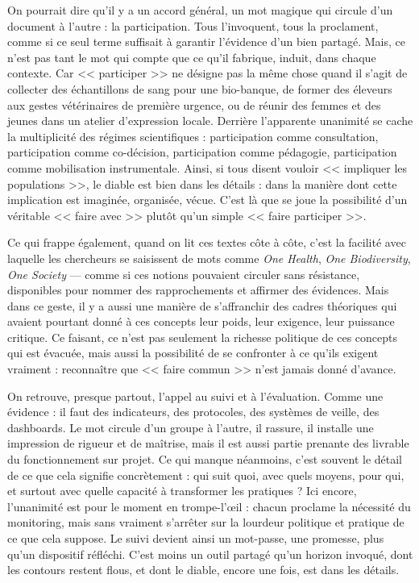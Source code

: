 \documentclass{article}
\begin{document}
On pourrait dire qu'il y a un accord général, un mot magique qui circule d'un document à l'autre : la participation. Tous l'invoquent, tous la proclament, comme si ce seul terme suffisait à garantir l'évidence d'un bien partagé. Mais, ce n'est pas tant le mot qui compte que ce qu'il fabrique, induit, dans chaque contexte. Car << participer >> ne désigne pas la même chose quand il s'agit de collecter des échantillons de sang pour une bio-banque, de former des éleveurs aux gestes vétérinaires de première urgence, ou de réunir des femmes et des jeunes dans un atelier d'expression locale. Derrière l'apparente unanimité se cache la multiplicité des régimes scientifiques : participation comme consultation, participation comme co-décision, participation comme pédagogie, participation comme mobilisation instrumentale. Ainsi, si tous disent vouloir << impliquer les populations >>, le diable est bien dans les détails : dans la manière dont cette implication est imaginée, organisée, vécue. C'est là que se joue la possibilité d'un véritable << faire avec >> plutôt qu'un simple << faire participer >>.

Ce qui frappe également, quand on lit ces textes côte à côte, c'est la facilité avec laquelle les chercheurs se saisissent de mots comme \textit{One Health}, \textit{One Biodiversity}, \textit{One Society} — comme si ces notions pouvaient circuler sans résistance, disponibles pour nommer des rapprochements et affirmer des évidences. Mais dans ce geste, il y a aussi une manière de s'affranchir des cadres théoriques qui avaient pourtant donné à ces concepts leur poids, leur exigence, leur puissance critique. Ce faisant, ce n'est pas seulement la richesse politique de ces concepts qui est évacuée, mais aussi la possibilité de se confronter à ce qu'ils exigent vraiment : reconnaître que << faire commun >> n'est jamais donné d'avance.

On retrouve, presque partout, l'appel au suivi et à l'évaluation. Comme une évidence : il faut des indicateurs, des protocoles, des systèmes de veille, des dashboards. Le mot circule d'un groupe à l'autre, il rassure, il installe une impression de rigueur et de maîtrise, mais il est aussi partie prenante des livrable du fonctionnement sur projet. Ce qui manque néanmoins, c'est souvent le détail de ce que cela signifie concrètement : qui suit quoi, avec quels moyens, pour qui, et surtout avec quelle capacité à transformer les pratiques ? Ici encore, l'unanimité est pour le moment en trompe-l'\oe{}il : chacun proclame la nécessité du monitoring, mais sans vraiment s'arrêter sur la lourdeur politique et pratique de ce que cela suppose. Le suivi devient ainsi un mot-passe, une promesse, plus qu'un dispositif réfléchi. C'est moins un outil partagé qu'un horizon invoqué, dont les contours restent flous, et dont le diable, encore une fois, est dans les détails.
\end{document}
